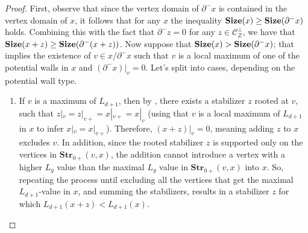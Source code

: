 \begin{proof}
  First, observe that since the vertex domain of $\partial^{-} x$ is contained in the vertex domain of $x$, it follows that for any $x$ the inequality $\mathbf{Size}(x) \ge \mathbf{Size}(\partial^{-} x)$ holds. Combining this with the fact that $\partial^{-} z = 0$ for any $z \in \mathcal{C}_{Z}^{\perp}$, we have that $\mathbf{Size}(x + z) \ge \mathbf{Size}(\partial^{-}(x + z))$. Now suppose that $\mathbf{Size}(x) > \mathbf{Size}(\partial^{-} x)$; that implies the existence of $v \in x/\partial^{-} x$ such that $v$ is a local maximum of one of the potential walls in $x$ and $(\partial^{-} x)|_{v} = 0$. Let's split into cases, depending on the potential wall type.
 
  \begin{enumerate}

      \item If $v$ is a maximum of $L_{d+1}$, then by , there exists a stabilizer $z$ rooted at $v$, such that $z|_{v}=z|_{v+}=x|_{v+}=x|_{v}$ (using that $v$ is a local maximum of $L_{d+1}$ in $x$ to infer $x|_{v}=x|_{v+}$). Therefore, $(x+z)|_{v} = 0$, meaning adding $z$ to $x$ excludes $v$. In addition, since the rooted stabilizer $z$ is supported only on the vertices in $\textbf{Str}_{0+}(v,x)$, the addition cannot introduce a vertex with a higher $L_{g}$ value than the maximal $L_{g}$ value in $\textbf{Str}_{0+}(v,x)$ into $x$. So, repeating the process until excluding all the vertices that get the maximal $L_{d+1}$-value in $x$, and summing the stabilizers, results in a stabilizer $z$ for which $L_{d+1}(x+z) < L_{d+1}(x)$.



\end{enumerate}
\end{proof}
